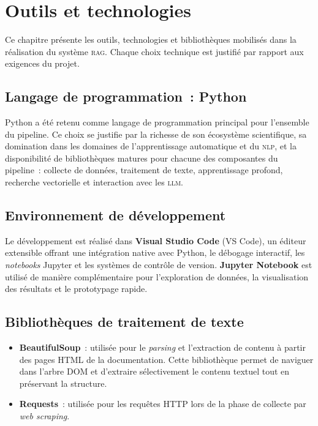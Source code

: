 \documentclass[12pt,a4paper,oneside]{report}
\newcommand{\rag}{\textsc{rag}}
\newcommand{\nlp}{\textsc{nlp}}
\newcommand{\llm}{\textsc{llm}}
\begin{document}
\chapter{Outils et technologies}
\label{chap:outils}

Ce chapitre présente les outils, technologies et bibliothèques mobilisés dans la réalisation du système \rag{}. Chaque choix technique est justifié par rapport aux exigences du projet.

\section{Langage de programmation~: Python}

Python a été retenu comme langage de programmation principal pour l'ensemble du pipeline. Ce choix se justifie par la richesse de son écosystème scientifique, sa domination dans les domaines de l'apprentissage automatique et du \nlp{}, et la disponibilité de bibliothèques matures pour chacune des composantes du pipeline~: collecte de données, traitement de texte, apprentissage profond, recherche vectorielle et interaction avec les \llm{}.

\section{Environnement de développement}

Le développement est réalisé dans \textbf{Visual Studio Code} (VS Code), un éditeur extensible offrant une intégration native avec Python, le débogage interactif, les \textit{notebooks} Jupyter et les systèmes de contrôle de version. \textbf{Jupyter Notebook} est utilisé de manière complémentaire pour l'exploration de données, la visualisation des résultats et le prototypage rapide.

\section{Bibliothèques de traitement de texte}

\begin{itemize}
  \item \textbf{BeautifulSoup}~: utilisée pour le \textit{parsing} et l'extraction de contenu à partir des pages HTML de la documentation. Cette bibliothèque permet de naviguer dans l'arbre DOM et d'extraire sélectivement le contenu textuel tout en préservant la structure.
  \item \textbf{Requests}~: utilisée pour les requêtes HTTP lors de la phase de collecte par \textit{web scraping}.
\end{itemize}
\end{document}
